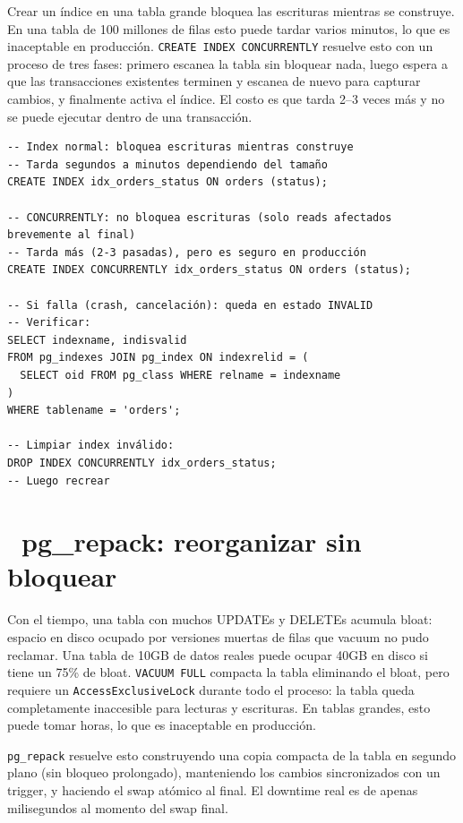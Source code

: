 Crear un índice en una tabla grande bloquea las escrituras mientras se construye.
En una tabla de 100 millones de filas esto puede tardar varios minutos, lo que es inaceptable en producción.
\texttt{CREATE INDEX CONCURRENTLY} resuelve esto con un proceso de tres fases:
primero escanea la tabla sin bloquear nada, luego espera a que las transacciones existentes terminen y escanea de nuevo para capturar cambios, y finalmente activa el índice.
El costo es que tarda 2--3 veces más y no se puede ejecutar dentro de una transacción.

\begin{lstlisting}[caption={Diferencias entre index normal y CONCURRENTLY}]
-- Index normal: bloquea escrituras mientras construye
-- Tarda segundos a minutos dependiendo del tamaño
CREATE INDEX idx_orders_status ON orders (status);

-- CONCURRENTLY: no bloquea escrituras (solo reads afectados brevemente al final)
-- Tarda más (2-3 pasadas), pero es seguro en producción
CREATE INDEX CONCURRENTLY idx_orders_status ON orders (status);

-- Si falla (crash, cancelación): queda en estado INVALID
-- Verificar:
SELECT indexname, indisvalid
FROM pg_indexes JOIN pg_index ON indexrelid = (
  SELECT oid FROM pg_class WHERE relname = indexname
)
WHERE tablename = 'orders';

-- Limpiar index inválido:
DROP INDEX CONCURRENTLY idx_orders_status;
-- Luego recrear
\end{lstlisting}

\section[pg\_repack: reorganizar sin bloquear]{~pg\_repack: reorganizar sin bloquear}

Con el tiempo, una tabla con muchos UPDATEs y DELETEs acumula bloat: espacio en disco ocupado por versiones muertas de filas que vacuum no pudo reclamar.
Una tabla de 10GB de datos reales puede ocupar 40GB en disco si tiene un 75\% de bloat.
\texttt{VACUUM FULL} compacta la tabla eliminando el bloat, pero requiere un \texttt{AccessExclusiveLock} durante todo el proceso: la tabla queda completamente inaccesible para lecturas y escrituras.
En tablas grandes, esto puede tomar horas, lo que es inaceptable en producción.

\texttt{pg\_repack} resuelve esto construyendo una copia compacta de la tabla en segundo plano (sin bloqueo prolongado), manteniendo los cambios sincronizados con un trigger, y haciendo el swap atómico al final.
El downtime real es de apenas milisegundos al momento del swap final.

